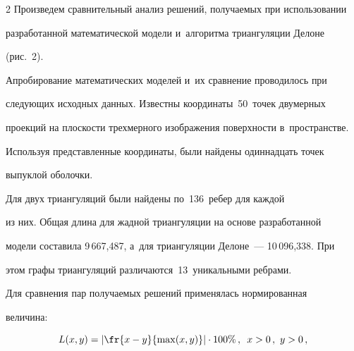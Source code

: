 \begin{multicols}{2}
  Произведем сравнительный анализ решений, по\-лу\-ча\-емых при использовании 


разработанной математической модели и~алгоритма триангуляции Делоне 


(рис.~2).








  


  Апробирование математических моделей и~их сравнение проводилось при 


сле\-ду\-ющих исходных данных. Известны координаты~50~точек двумерных 


проекций на плоскости трехмерного изображения по\-верх\-ности в~пространстве.


  


  Используя представленные координаты, были найдены одиннадцать точек 


выпуклой оболочки.


  


  Для двух триангуляций были найдены по~136~ребер для каж\-дой


  из них. Общая длина для жад\-ной триангуляции на основе разработанной 


модели составила 9\,667,487, а~для триангуляции Делоне~--- 10\,096,338. При 


этом графы триангуляций различаются~13~уникальными ребрами.


  


  Для сравнения пар по\-лу\-ча\-емых решений применялась нормированная 


величина:


  \begin{equation}


  L(x,y) =\left\vert  \fr{x-y}{\max(x,y)}\right\vert \cdot 100\%\,,\enskip x>0\,,\ 


y>0\,,


  \label{e11-man}


  \end{equation}


  


  \vspace*{9pt}


  


   { \begin{center}  %



\end{center}}
\end{multicols}
